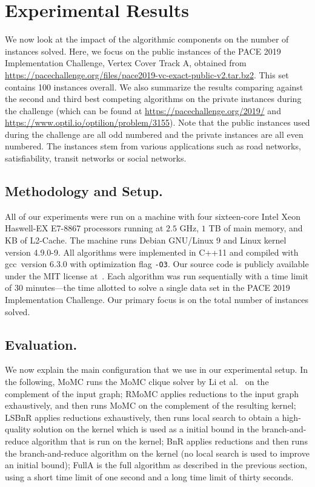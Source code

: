 \documentclass[twoside,leqno,twocolumn]{article}
\newcommand{\AlgName}[1]{\textsf{#1}}
\begin{document}
\section{Experimental Results}
\label{sec:experiments}
We now look at the impact of the algorithmic components on the number of instances solved.
Here, we focus on the public instances  of the PACE 2019 Implementation Challenge, Vertex Cover Track A, obtained from \url{https://pacechallenge.org/files/pace2019-vc-exact-public-v2.tar.bz2}. This set contains 100 instances overall. We also summarize the results comparing against the second and third best competing algorithms on the private instances during the challenge (which can be found at \url{https://pacechallenge.org/2019/} and \url{https://www.optil.io/optilion/problem/3155}). Note that the public instances used during the challenge are all odd numbered and the private instances are all even numbered. The instances stem from various applications such as road networks, satisfiability, transit networks or social networks.

\subsection{Methodology and Setup.}
All of our experiments were run on a machine with  four sixteen-core Intel Xeon Haswell-EX E7-8867 processors running at $2.5$ GHz, $1$ TB of main memory, and  KB of L2-Cache.
The machine runs Debian GNU/Linux 9 and Linux kernel version 4.9.0-9.
All algorithms were implemented in C++11 and compiled with gcc~version 6.3.0 with optimization flag \texttt{-O3}. Our source code is publicly available under the MIT license at~\cite{wegotyoucovered2019}.
Each algorithm was run sequentially with a time limit of 30 minutes---the time allotted to solve a single data set in the PACE 2019 Implementation Challenge. Our primary focus is on the total number of instances solved.
\subsection{Evaluation.}
We now explain the main configuration that we use in our experimental setup.
In the following, \AlgName{MoMC} runs the MoMC clique solver by Li et
al.~\cite{DBLP:journals/cor/LiJM17} on the complement of the input graph;
\AlgName{RMoMC} applies reductions to the input graph exhaustively, and then
runs MoMC on the complement of the resulting kernel; \AlgName{LSBnR} applies
reductions exhaustively, then runs local search to obtain a high-quality
solution on the kernel which is used as a initial bound in the branch-and-reduce
algorithm that is run on the kernel; \AlgName{BnR} applies reductions and then
runs the branch-and-reduce algorithm on the kernel (no local search is used to
improve an initial bound); \AlgName{FullA} is the full algorithm as described in
the previous section, using a short time limit of one second and a long time limit of thirty seconds.
\end{document}
